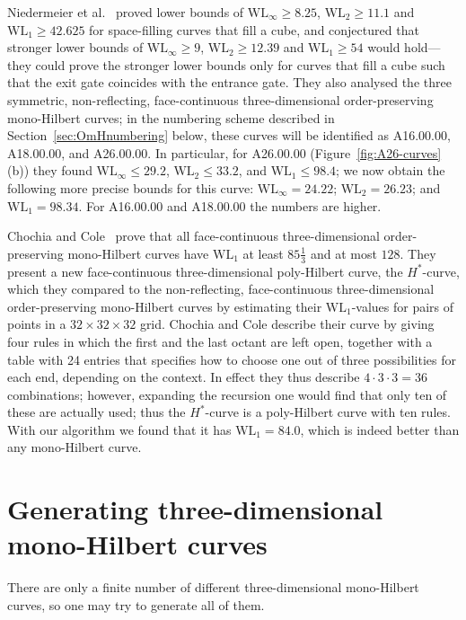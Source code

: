 \documentclass[11pt,a4paper]{article}
\def\WLMax{\ensuremath{\mathrm{WL}_\infty}\xspace}
\def\WLEuc{\ensuremath{\mathrm{WL}_2}\xspace}
\def\WLMan{\ensuremath{\mathrm{WL}_1}\xspace}
\begin{document}
Niedermeier et al.~\cite{Niedermeier} proved lower bounds of $\WLMax \geq 8.25$, $\WLEuc \geq 11.1$ and $\WLMan \geq 42.625$ for space-filling curves that fill a cube, and conjectured that stronger lower bounds of $\WLMax \geq 9$, $\WLEuc \geq 12.39$ and $\WLMan \geq 54$ would hold---they could prove the stronger lower bounds only for curves that fill a cube such that the exit gate coincides with the entrance gate. They also analysed the three symmetric, non-reflecting, face-continuous three-dimensional order-preserving mono-Hilbert curves; in the numbering scheme described in Section~\ref{sec:OmHnumbering} below, these curves will be identified as A16.00.00, A18.00.00, and A26.00.00. In particular, for A26.00.00 (Figure~\ref{fig:A26-curves}(b)) they found $\WLMax \leq 29.2$, $\WLEuc \leq 33.2$, and $\WLMan \leq 98.4$; we now obtain the following more precise bounds for this curve: $\WLMax = 24.22$; $\WLEuc = 26.23$; and $\WLMan = 98.34$. For A16.00.00 and A18.00.00 the numbers are higher.

Chochia and Cole~\cite{Chochia} prove that all face-continuous three-dimensional order-preserving mono-Hilbert curves have $\WLMan$ at least $85\frac13$ and at most $128$. They present a new face-continuous three-dimensional poly-Hilbert curve, the $H^*$-curve, which they compared to the non-reflecting, face-continuous three-dimensional order-preserving mono-Hilbert curves by estimating  their \WLMan-values for pairs of points in a $32\times 32\times 32$ grid. Chochia and Cole describe their curve by giving four rules in which the first and the last octant are left open, together with a table with 24 entries that specifies how to choose one out of three possibilities for each end, depending on the context. In effect they thus describe $4 \cdot 3 \cdot 3 = 36$ combinations; however, expanding the recursion one would find that only ten of these are actually used; thus the $H^*$-curve is a poly-Hilbert curve with ten rules. With our algorithm we found that it has $\WLMan = 84.0$, which is indeed better than any mono-Hilbert curve.

\section{Generating three-dimensional mono-Hilbert curves}
\label{sec:generating}

There are only a finite number of different three-dimensional mono-Hilbert curves, so one may try to generate all of them.
\end{document}
